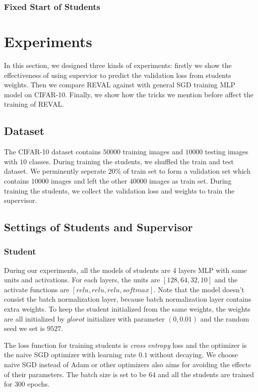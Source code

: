 \documentclass[english]{sobraep}
\begin{document}
\subsubsection{Fixed Start of Students}

\section{Experiments}

In this section, we designed three kinds of experiments: firstly we show the effectiveness of using supervior to predict the validation loss from students weights. Then we compare REVAL against with general SGD training  MLP model on CIFAR-10. Finally, we show how the tricks we mention before affect the training of REVAL.


\subsection{Dataset}

The CIFAR-10 dataset contains $50000$ training images and $10000$ testing images with $10$ classes. During training the students, we shuffled the train and test dataset. We perminently seperate $20\%$ of train set to form a validation set which contains $10000$ images and left the other $40000$ images as train set. During training the students, we collect the validation loss and weights to train the supervisor.

\subsection{Settings of Students and Supervisor}

\subsubsection{Student} During our experiments, all the models of students are 4 layers MLP with same units and activations. For each layers, the units are $[128, 64, 32, 10]$ and the activate functions are $[relu, relu, relu, softmax]$. Note that the model doesn't consist the batch normalization layer, because batch normalization layer contains extra weights. To keep the student initialized from the same weights, the weights are all initialized by $glorot$ initializer with parameter $(0, 0.01)$ and the random seed we set is $9527$.

The loss function for training students is \textit{cross entropy} loss and the optimizer is the naive SGD optimizer with learning rate $0.1$ without decaying. We choose naive SGD instead of Adam or other optimizers also aims for avoiding the effects of their parameters. The batch size is set to be $64$ and all the students are trained for $300$ epochs. 
\end{document}
